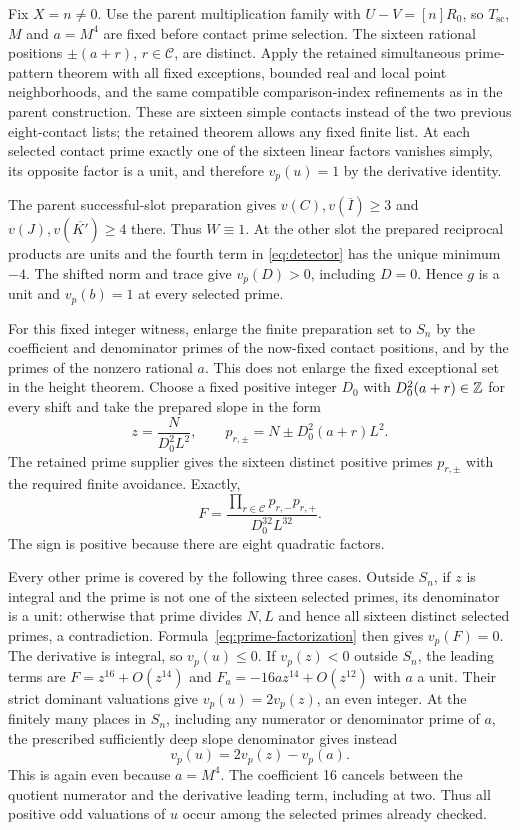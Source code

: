 \documentclass[11pt,a4paper]{article}
\begin{document}
Fix $X=n\ne0$. Use the parent multiplication family with
$U-V=[n]R_0$, so $T_{\mathrm{sc}}$, $M$ and $a=M^4$ are fixed before
contact prime selection. The sixteen rational positions $\pm(a+r)$,
$r\in\mathcal C$, are distinct. Apply the retained simultaneous
prime-pattern theorem with all fixed exceptions, bounded real and local
point neighborhoods, and the same compatible comparison-index refinements
as in the parent construction. These are sixteen simple contacts instead
of the two previous eight-contact lists; the retained theorem allows any
fixed finite list. At each selected contact prime exactly one of the
sixteen linear factors vanishes simply, its opposite factor is a unit,
and therefore $v_p(u)=1$ by the derivative identity.

The parent successful-slot preparation gives $v(C),v(\overline I)\ge3$
and $v(J),v(\overline{K'})\ge4$ there. Thus $W\equiv1$. At the other
slot the prepared reciprocal products are units and the fourth term in
\eqref{eq:detector} has the unique minimum $-4$. The shifted norm and
trace give $v_p(D)>0$, including $D=0$. Hence $g$ is a unit and
$v_p(b)=1$ at every selected prime.

For this fixed integer witness, enlarge the finite preparation set to
$S_n$ by the coefficient and denominator primes of the now-fixed contact
positions, and by the primes of the nonzero rational $a$. This does not
enlarge the fixed exceptional set in the height theorem. Choose a fixed
positive integer $D_0$ with $D_0^2(a+r)\in\mathbb Z$ for every shift and take
the prepared slope in the form
\[
 z=\frac{N}{D_0^2L^2},\qquad
 p_{r,\pm}=N\pm D_0^2(a+r)L^2.
\]
The retained prime supplier gives the sixteen distinct positive primes
$p_{r,\pm}$ with the required finite avoidance. Exactly,
\begin{equation}\label{eq:prime-factorization}
 F=\frac{\prod_{r\in\mathcal C}p_{r,-}p_{r,+}}
                {D_0^{32}L^{32}}.
\end{equation}
The sign is positive because there are eight quadratic factors.

Every other prime is covered by the following three cases. Outside
$S_n$, if $z$ is integral and the prime is not one of the sixteen selected
primes, its denominator is a unit: otherwise that prime divides $N,L$
and hence all sixteen distinct selected primes, a contradiction.
Formula~\eqref{eq:prime-factorization} then gives $v_p(F)=0$.
The derivative is integral, so $v_p(u)\le0$. If $v_p(z)<0$ outside
$S_n$, the leading terms are $F=z^{16}+O(z^{14})$ and
$F_a=-16az^{14}+O(z^{12})$ with $a$ a unit. Their strict dominant
valuations give $v_p(u)=2v_p(z)$, an even integer. At the finitely many
places in $S_n$, including any numerator or denominator prime of $a$,
the prescribed sufficiently deep slope denominator gives instead
\[
                      v_p(u)=2v_p(z)-v_p(a).
\]
This is again even because $a=M^4$. The coefficient 16 cancels between
the quotient numerator and the derivative leading term, including at
two. Thus all positive odd valuations of $u$ occur among the selected
primes already checked.
\end{document}
